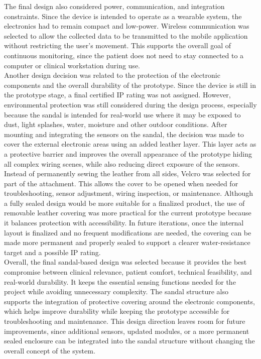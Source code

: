 The final design also considered power, communication, and integration constraints. Since the device is intended to operate as a wearable system, the electronics had to remain compact and low-power. Wireless communication was selected to allow the collected data to be transmitted to the mobile application without restricting the user's movement. This supports the overall goal of continuous monitoring, since the patient does not need to stay connected to a computer or clinical workstation during use. \\

Another design decision was related to the protection of the electronic components and the overall durability of the prototype. Since the device is still in the prototype stage, a final certified IP rating was not assigned. However, environmental protection was still considered during the design process, especially because the sandal is intended for real-world use where it may be exposed to dust, light splashes, water, moisture and other outdoor conditions. After mounting and integrating the sensors on the sandal, the decision was made to cover the external electronic areas using an added leather layer. This layer acts as a protective barrier and improves the overall appearance of the prototype hiding all complex wiring scenes, while also reducing direct exposure of the sensors. Instead of permanently sewing the leather from all sides, Velcro was selected for part of the attachment. This allows the cover to be opened when needed for troubleshooting, sensor adjustment, wiring inspection, or maintenance. Although a fully sealed design would be more suitable for a finalized product, the use of removable leather covering was more practical for the current prototype because it balances protection with accessibility. In future iterations, once the internal layout is finalized and no frequent modifications are needed, the covering can be made more permanent and properly sealed to support a clearer water-resistance target and a possible IP rating. \\

Overall, the final sandal-based design was selected because it provides the best compromise between clinical relevance, patient comfort, technical feasibility, and real-world durability. It keeps the essential sensing functions needed for the project while avoiding unnecessary complexity. The sandal structure also supports the integration of protective covering around the electronic components, which helps improve durability while keeping the prototype accessible for troubleshooting and maintenance. This design direction leaves room for future improvements, since additional sensors, updated modules, or a more permanent sealed enclosure can be integrated into the sandal structure without changing the overall concept of the system. \\

